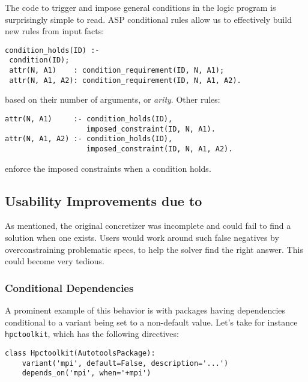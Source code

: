 The code to trigger and impose general conditions in the logic program is surprisingly simple to read. ASP conditional rules allow us to effectively build new rules from input facts:
%
\begin{verbatim}
condition_holds(ID) :-
 condition(ID);
 attr(N, A1)    : condition_requirement(ID, N, A1);
 attr(N, A1, A2): condition_requirement(ID, N, A1, A2).
\end{verbatim}
%
based on their number of arguments, or \emph{arity}. Other rules:
%
\begin{verbatim}
attr(N, A1)     :- condition_holds(ID),
                   imposed_constraint(ID, N, A1).
attr(N, A1, A2) :- condition_holds(ID),
                   imposed_constraint(ID, N, A1, A2).
\end{verbatim}
%
enforce the imposed constraints when a condition holds.

\subsection{Usability Improvements due to \clingo}
As mentioned, the original concretizer was incomplete and could fail to find a solution
when one exists. Users would work around such false negatives by overconstraining
problematic specs, to help the solver find the right answer. This could become very
tedious.


\subsubsection{Conditional Dependencies}
A prominent example of this behavior is with packages having dependencies conditional to a variant being set to a non-default value. Let's take for instance {\tt hpctoolkit}, which has the following directives:

\begin{verbatim}
class Hpctoolkit(AutotoolsPackage):
    variant('mpi', default=False, description='...')
    depends_on('mpi', when='+mpi')
\end{verbatim}


